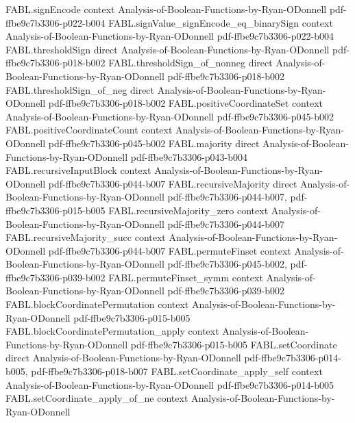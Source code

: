 \begin{theorem}
\proofstep
  {FABL.signEncode}
  {context}
  {Analysis-of-Boolean-Functions-by-Ryan-ODonnell}
  {pdf-ffbe9c7b3306-p022-b004}
\proofstep
  {FABL.signValue_signEncode_eq_binarySign}
  {context}
  {Analysis-of-Boolean-Functions-by-Ryan-ODonnell}
  {pdf-ffbe9c7b3306-p022-b004}
\proofstep
  {FABL.thresholdSign}
  {direct}
  {Analysis-of-Boolean-Functions-by-Ryan-ODonnell}
  {pdf-ffbe9c7b3306-p018-b002}
\proofstep
  {FABL.thresholdSign_of_nonneg}
  {direct}
  {Analysis-of-Boolean-Functions-by-Ryan-ODonnell}
  {pdf-ffbe9c7b3306-p018-b002}
\proofstep
  {FABL.thresholdSign_of_neg}
  {direct}
  {Analysis-of-Boolean-Functions-by-Ryan-ODonnell}
  {pdf-ffbe9c7b3306-p018-b002}
\proofstep
  {FABL.positiveCoordinateSet}
  {context}
  {Analysis-of-Boolean-Functions-by-Ryan-ODonnell}
  {pdf-ffbe9c7b3306-p045-b002}
\proofstep
  {FABL.positiveCoordinateCount}
  {context}
  {Analysis-of-Boolean-Functions-by-Ryan-ODonnell}
  {pdf-ffbe9c7b3306-p045-b002}
\proofstep
  {FABL.majority}
  {direct}
  {Analysis-of-Boolean-Functions-by-Ryan-ODonnell}
  {pdf-ffbe9c7b3306-p043-b004}
\proofstep
  {FABL.recursiveInputBlock}
  {context}
  {Analysis-of-Boolean-Functions-by-Ryan-ODonnell}
  {pdf-ffbe9c7b3306-p044-b007}
\proofstep
  {FABL.recursiveMajority}
  {direct}
  {Analysis-of-Boolean-Functions-by-Ryan-ODonnell}
  {pdf-ffbe9c7b3306-p044-b007,
    pdf-ffbe9c7b3306-p015-b005}
\proofstep
  {FABL.recursiveMajority_zero}
  {context}
  {Analysis-of-Boolean-Functions-by-Ryan-ODonnell}
  {pdf-ffbe9c7b3306-p044-b007}
\proofstep
  {FABL.recursiveMajority_succ}
  {context}
  {Analysis-of-Boolean-Functions-by-Ryan-ODonnell}
  {pdf-ffbe9c7b3306-p044-b007}
\proofstep
  {FABL.permuteFinset}
  {context}
  {Analysis-of-Boolean-Functions-by-Ryan-ODonnell}
  {pdf-ffbe9c7b3306-p045-b002,
    pdf-ffbe9c7b3306-p039-b002}
\proofstep
  {FABL.permuteFinset_symm}
  {context}
  {Analysis-of-Boolean-Functions-by-Ryan-ODonnell}
  {pdf-ffbe9c7b3306-p039-b002}
\proofstep
  {FABL.blockCoordinatePermutation}
  {context}
  {Analysis-of-Boolean-Functions-by-Ryan-ODonnell}
  {pdf-ffbe9c7b3306-p015-b005}
\proofstep
  {FABL.blockCoordinatePermutation_apply}
  {context}
  {Analysis-of-Boolean-Functions-by-Ryan-ODonnell}
  {pdf-ffbe9c7b3306-p015-b005}
\proofstep
  {FABL.setCoordinate}
  {direct}
  {Analysis-of-Boolean-Functions-by-Ryan-ODonnell}
  {pdf-ffbe9c7b3306-p014-b005,
    pdf-ffbe9c7b3306-p018-b007}
\proofstep
  {FABL.setCoordinate_apply_self}
  {context}
  {Analysis-of-Boolean-Functions-by-Ryan-ODonnell}
  {pdf-ffbe9c7b3306-p014-b005}
\proofstep
  {FABL.setCoordinate_apply_of_ne}
  {context}
  {Analysis-of-Boolean-Functions-by-Ryan-ODonnell}

\end{theorem}
